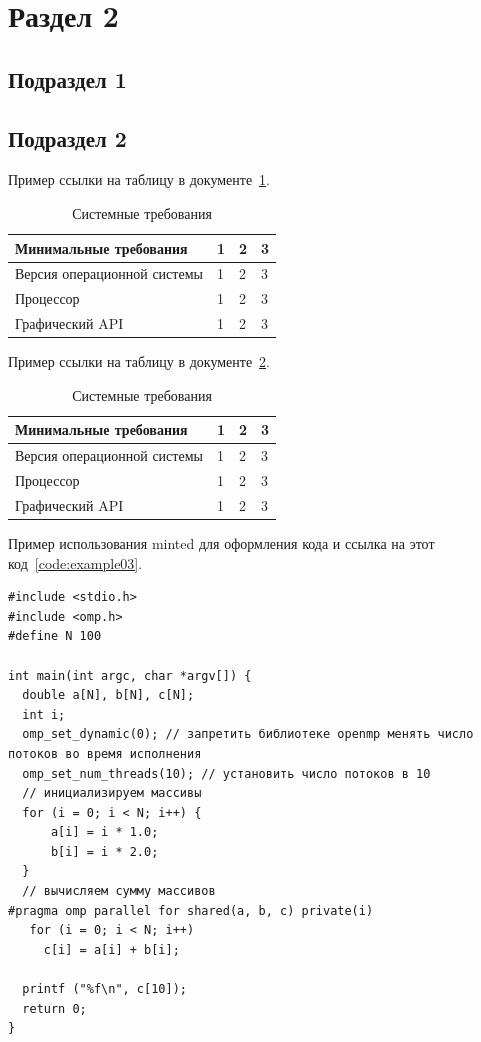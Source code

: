 \section{\label{sec:ch02/sec02}Раздел 2}

\subsection{\label{subsec:ch02/sec02/sub01}Подраздел 1}

\subsection{\label{subsec:ch02/sec02/sub02}Подраздел 2}

Пример ссылки на таблицу в документе~\ref{tab:example03}.
\begin{table}[H]
\caption{\label{tab:example03}Системные требования}
\begin{tabular}{|p{3 cm}|p{3 cm}|p{3 cm}|p{5 cm}|}
\hline
Минимальные требования & 1 & 2 & 3 \\ \hline
Версия операционной системы & 1 & 2 & 3 \\ \hline
Процессор & 1 & 2 & 3 \\ \hline
Графический API & 1 & 2 & 3 \\ \hline
\end{tabular}
\end{table}

Пример ссылки на таблицу в документе~\ref{tab:example04}.
\begin{table}[H]
\caption{\centering\label{tab:example04}Системные требования}
\begin{tabular}{|p{3 cm}|p{3 cm}|p{3 cm}|p{5 cm}|}
\hline
Минимальные требования & 1 & 2 & 3 \\ \hline
Версия операционной системы & 1 & 2 & 3 \\ \hline
Процессор & 1 & 2 & 3 \\ \hline
Графический API & 1 & 2 & 3 \\ \hline
\end{tabular}
\end{table}

Пример использования minted для оформления кода и ссылка на этот код~\ref{code:example03}.
\begin{code}
\vspace{-\baselineskip}\begin{verbatim}
#include <stdio.h>
#include <omp.h>
#define N 100

int main(int argc, char *argv[]) {
  double a[N], b[N], c[N];
  int i;
  omp_set_dynamic(0); // запретить библиотеке openmp менять число потоков во время исполнения
  omp_set_num_threads(10); // установить число потоков в 10
  // инициализируем массивы
  for (i = 0; i < N; i++) {
      a[i] = i * 1.0;
      b[i] = i * 2.0;
  }
  // вычисляем сумму массивов
#pragma omp parallel for shared(a, b, c) private(i)
   for (i = 0; i < N; i++)
     c[i] = a[i] + b[i];

  printf ("%f\n", c[10]);
  return 0;
}
\end{verbatim}
\end{code}

